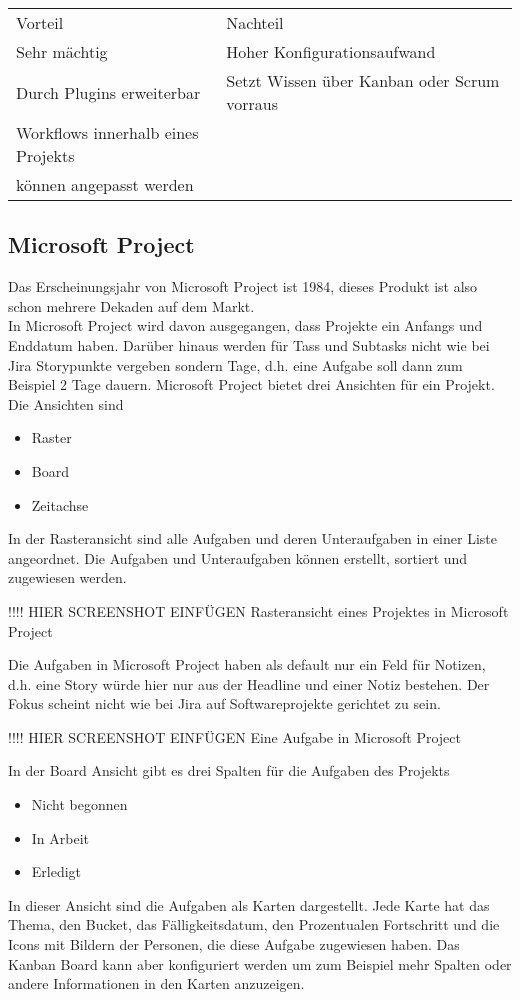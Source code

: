\begin{table}[]
    \begin{tabular}{ll}
    Vorteil         & Nachteil                                    \\
    Sehr mächtig    & Hoher Konfigurationsaufwand                 \\
    Durch Plugins erweiterbar   & Setzt Wissen über Kanban oder Scrum vorraus \\
    Workflows innerhalb eines Projekts\\
    können angepasst werden     &                                            
    \end{tabular}
\end{table}

\subsection{Microsoft Project}

Das Erscheinungsjahr von Microsoft Project ist 1984, dieses Produkt ist also schon mehrere Dekaden auf dem Markt.\\
In Microsoft Project wird davon ausgegangen, dass Projekte ein Anfangs und Enddatum haben. Darüber hinaus werden für Tass und Subtasks nicht wie bei Jira Storypunkte vergeben sondern Tage, d.h. eine Aufgabe soll dann zum Beispiel 2 Tage dauern. Microsoft Project bietet drei Ansichten für ein Projekt. \\
Die Ansichten sind
\begin{itemize}
\item Raster  
\item Board  
\item Zeitachse
\end{itemize}
In der Rasteransicht sind alle Aufgaben und deren Unteraufgaben in einer Liste angeordnet. Die Aufgaben und Unteraufgaben können erstellt, sortiert und zugewiesen werden.  

!!!! HIER SCREENSHOT EINFÜGEN
Rasteransicht eines Projektes in Microsoft Project

Die Aufgaben in Microsoft Project haben als default nur ein Feld für Notizen, d.h. eine Story würde hier nur aus der Headline und einer Notiz bestehen. Der Fokus scheint nicht wie bei Jira auf Softwareprojekte gerichtet zu sein.  

!!!! HIER SCREENSHOT EINFÜGEN
Eine Aufgabe in Microsoft Project 

In der Board Ansicht gibt es drei Spalten für die Aufgaben des Projekts\\
\begin{itemize}
    \item Nicht begonnen 
    \item In Arbeit  
    \item Erledigt
\end{itemize}
In dieser Ansicht sind die Aufgaben als Karten dargestellt. Jede Karte hat das Thema, den Bucket, das Fälligkeitsdatum, den Prozentualen Fortschritt und die Icons mit Bildern der Personen, die diese Aufgabe zugewiesen haben. Das Kanban Board kann aber konfiguriert werden um zum Beispiel mehr Spalten oder andere Informationen in den Karten anzuzeigen.\\

